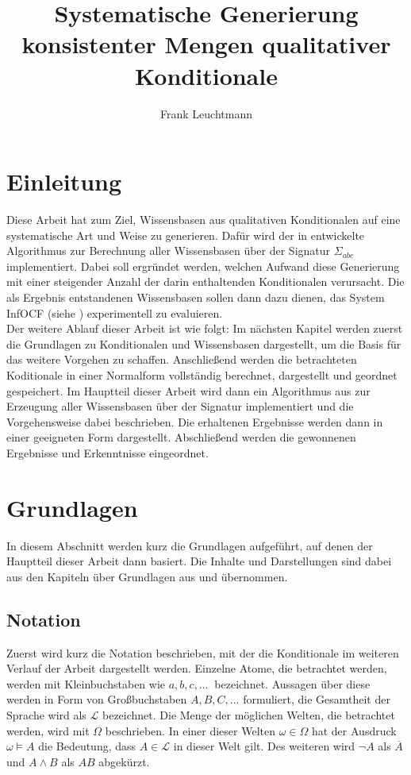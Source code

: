 \documentclass[12pt,a4paper]{article}
\author{Frank Leuchtmann}
\title{Systematische Generierung konsistenter Mengen qualitativer
Konditionale}
\newcommand{\lag}{\mathcal{L}}
\begin{document}
\maketitle
\newpage
\tableofcontents
\newpage
\section{Einleitung}
Diese Arbeit hat zum Ziel, Wissensbasen aus qualitativen Konditionalen auf eine systematische Art und Weise zu generieren. Dafür wird der in \cite{beierle19} entwickelte Algorithmus zur Berechnung aller Wissensbasen über der Signatur $\Sigma_{abc}$ implementiert. Dabei soll ergründet werden, welchen Aufwand diese Generierung mit einer steigender Anzahl der darin  enthaltenden Konditionalen verursacht. Die als Ergebnis entstandenen Wissensbasen sollen dann dazu dienen, das System InfOCF (siehe \cite{beierle17}) experimentell zu evaluieren.
\\
Der weitere Ablauf dieser Arbeit ist wie folgt: Im nächsten Kapitel werden zuerst die Grundlagen zu Konditionalen und Wissensbasen dargestellt, um die Basis für das weitere Vorgehen zu schaffen. Anschließend werden die betrachteten Koditionale in einer Normalform vollständig berechnet, dargestellt und geordnet gespeichert. Im Hauptteil dieser Arbeit wird dann ein Algorithmus aus \cite{beierle19} zur Erzeugung aller Wissensbasen über der Signatur implementiert und die Vorgehensweise dabei beschrieben. Die erhaltenen Ergebnisse werden dann in einer geeigneten Form dargestellt. Abschließend werden die gewonnenen Ergebnisse und Erkenntnisse eingeordnet.
\section{Grundlagen}
In diesem Abschnitt werden kurz die Grundlagen aufgeführt, auf denen der Hauptteil dieser Arbeit dann basiert. Die Inhalte und Darstellungen sind dabei aus den Kapiteln über Grundlagen aus \cite{beierle19} und \cite{beierle17} übernommen.
\subsection{Notation}
Zuerst wird kurz die Notation beschrieben, mit der die Konditionale im weiteren Verlauf der Arbeit dargestellt werden. Einzelne Atome, die betrachtet werden, werden mit Kleinbuchstaben wie $a, b, c,...\ $ bezeichnet. Aussagen über diese werden in Form von Großbuchstaben $A, B, C,...$ formuliert, die Gesamtheit der Sprache wird als $\lag$ bezeichnet. Die Menge der möglichen Welten, die betrachtet werden, wird mit $\Omega$ beschrieben. In einer dieser Welten $\omega \in \Omega$  hat der Ausdruck $\omega \models A$ die Bedeutung, dass $A \in \lag$ in dieser Welt gilt. Des weiteren wird $\neg A$ als $\overline{A}$ und $A \wedge B$ als $AB$ abgekürzt.
\end{document}
